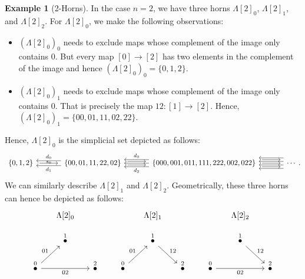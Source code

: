 \documentclass[11pt, a4paper]{amsart}
\theoremstyle{definition}
\newtheorem{example}[equation]{Example}
\theoremstyle{remark}
\numberwithin{equation}{section}
\begin{document}
\begin{example}[2-Horns] \label{ex:lambda two horns}
  In the case $n=2$, we have three horns $\Lambda[2]_0$, $\Lambda[2]_1$, and $\Lambda[2]_2$. For $\Lambda[2]_0$, we make the following observations:
\begin{itemize}
  \item $(\Lambda[2]_0)_0$ needs to exclude maps whose complement of the image only contains $0$. But every map $[0] \to [2]$ has two elements in the complement of the image and hence $(\Lambda[2]_0)_0 = \{0,1,2\}$.
  \item $(\Lambda[2]_0)_1$ needs to exclude maps whose complement of the image only contains $0$. That is precisely the map $12\colon[1] \to [2]$. Hence, $(\Lambda[2]_0)_1 = \{00,01,11,02,22\}$.
\end{itemize}
 Hence, $\Lambda[2]_0$ is the simplicial set depicted as follows:
  \[
  \begin{tikzcd}[column sep=1.2cm]
   \{0,1,2\} \arrow[r, shorten >=1ex,shorten <=1ex, "s_0"'  yshift= .2cm]
   & \{00,01,11,22,02\} 
   \arrow[l, shift left=1.4, "d_1"] \arrow[l, shift right=1.4, "d_0"'] 
   \arrow[r, shift right, shorten >=1ex,shorten <=1ex ] \arrow[r, shift left, shorten >=1ex,shorten <=1ex] 
   & \{000,001,011,111,222,002,022\} 
   \arrow[l] \arrow[l, shift left=2, "d_2"] \arrow[l, shift right=2, "d_0"'] 
   \arrow[r, shorten >=1ex,shorten <=1ex] \arrow[r, shift left=2, shorten >=1ex,shorten <=1ex] 
   \arrow[r, shift right=2, shorten >=1ex,shorten <=1ex]
   & \cdots 
   \arrow[l, shift right=1] \arrow[l, shift left=1] \arrow[l, shift right=3] \arrow[l, shift left=3] 
 \end{tikzcd}.
  \]
  We can similarly describe $\Lambda[2]_1$ and $\Lambda[2]_2$. Geometrically, these three horns can hence be depicted as follows:
  \[ 
  \begin{tikzcd}[row sep=0.5cm, column sep=0.5cm]
    & \Lambda[2]_0 & \\[-.2cm]
    & \overset{1}{\bullet}  & \\
    \overset{0}{\bullet} \arrow[ur, "01"] \arrow[rr, "02"'] &   & \overset{2}{\bullet}
  \end{tikzcd}
  \qquad
  \begin{tikzcd}[row sep=0.5cm, column sep=0.5cm]
    & \Lambda[2]_1 & \\[-.2cm]
    & \overset{1}{\bullet} \arrow[dr, "12"] & \\
    \overset{0}{\bullet} \arrow[ur, "01"] &   & \overset{2}{\bullet}
  \end{tikzcd}
    \qquad
  \begin{tikzcd}[row sep=0.5cm, column sep=0.5cm]
    & \Lambda[2]_2 & \\[-.2cm]
    & \overset{1}{\bullet} \arrow[dr, "12"] & \\
    \overset{0}{\bullet} \arrow[rr, "02"']  &   & \overset{2}{\bullet}
  \end{tikzcd}
  \]
\end{example}
\end{document}
